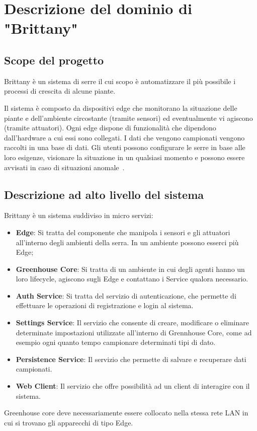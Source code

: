 \section{Descrizione del dominio di "Brittany"}

\subsection{Scope del progetto}

Brittany è un sistema di serre il cui scopo è automatizzare il più possibile i processi di crescita di alcune piante.

\noindent Il sistema è composto da dispositivi edge che monitorano la situazione delle piante e dell'ambiente circostante (tramite sensori) ed eventualmente vi agiscono (tramite attuatori). Ogni edge dispone di funzionalità che dipendono dall'hardware a cui essi sono collegati.
I dati che vengono campionati vengono raccolti in una base di dati. Gli utenti possono configurare le serre in base alle loro esigenze, visionare la situazione in un qualsiasi momento e possono essere avvisati in caso di situazioni anomale~\cite{Brittany65:online}.

\subsection{Descrizione ad alto livello del sistema}
Brittany è un sistema suddiviso in micro servizi:
\begin{itemize}
	\item \textbf{Edge}: Si tratta del componente che manipola i sensori e gli attuatori all’interno degli ambienti della serra. In un ambiente possono esserci più Edge;
	\item \textbf{Greenhouse Core}: Si tratta di un ambiente in cui degli agenti hanno un loro lifecycle, agiscono sugli Edge e contattano i Service qualora necessario.
	\item \textbf{Auth Service}: Si tratta del servizio di autenticazione, che permette di effettuare le operazioni di registrazione e login al sistema.
	\item \textbf{Settings Service}: Il servizio che consente di creare, modificare o eliminare determinate impostazioni utilizzate all’interno di Grennhouse Core, come ad esempio ogni quanto tempo campionare determinati tipi di dato.
	\item \textbf{Persistence Service}: Il servizio che permette di salvare e recuperare dati campionati.
	\item \textbf{Web Client}: Il servizio che offre possibilità ad un client di interagire con il sistema.
\end{itemize}
Greenhouse core deve necessariamente essere collocato nella stessa rete LAN in cui si trovano gli apparecchi di tipo Edge.

